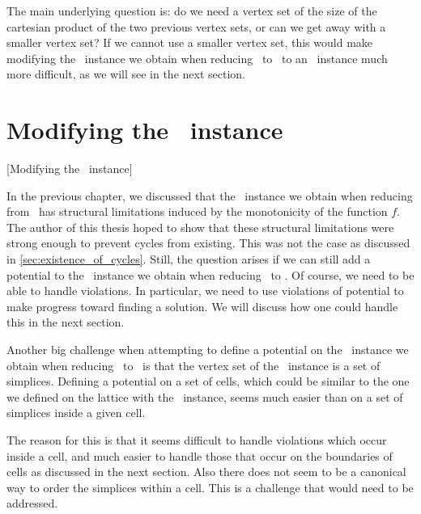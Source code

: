 The main underlying question is: do we need a vertex set of the size of the cartesian product of the two previous vertex sets, or can we get away with a smaller vertex set? If we cannot use a smaller vertex set, this would make modifying the \EndOfLine\ instance we obtain when reducing \Tarskistar\ to \EndOfLine\ to an \EndOfPotentialLine\ instance much more difficult, as we will see in the next section.

\section{Modifying the \EndOfLine\ instance}[Modifying the \EndOfLine\ instance]

In the previous chapter, we discussed that the \EndOfLine\ instance we obtain when reducing from \Tarskistar\ has structural limitations induced by the monotonicity of the function $f$. The author of this thesis hoped to show that these structural limitations were strong enough to prevent cycles from existing. This was not the case as discussed in \cref{sec:existence_of_cycles}. Still, the question arises if we can still add a potential to the \EndOfLine\ instance we obtain when reducing \Tarskistar\ to \EndOfLine\@. Of course, we need to be able to handle violations. In particular, we need to use violations of potential to make progress toward finding a solution. We will discuss how one could handle this in the next section.

Another big challenge when attempting to define a potential on the \EndOfLine\ instance we obtain when reducing \Tarskistar\ to \EndOfLine\ is that the vertex set of the \EndOfLine\ instance is a set of simplices. Defining a potential on a set of cells, which could be similar to the one we defined on the lattice with the \Localopt\ instance, seems much easier than on a set of simplices inside a given cell.

The reason for this is that it seems difficult to handle violations which occur inside a cell, and much easier to handle those that occur on the boundaries of cells as discussed in the next section. Also there does not seem to be a canonical way to order the simplices within a cell. This is a challenge that would need to be addressed.

